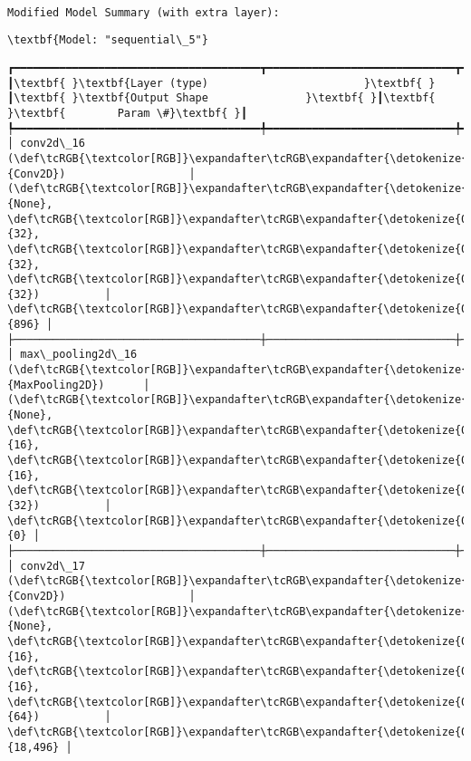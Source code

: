 \documentclass[11pt]{article}
\begin{document}
    \begin{Verbatim}[commandchars=\\\{\}]

Modified Model Summary (with extra layer):
    \end{Verbatim}

    
    \begin{Verbatim}[commandchars=\\\{\}]
\textbf{Model: "sequential\_5"}

    \end{Verbatim}

    
    
    \begin{Verbatim}[commandchars=\\\{\}]
┏━━━━━━━━━━━━━━━━━━━━━━━━━━━━━━━━━━━━━━┳━━━━━━━━━━━━━━━━━━━━━━━━━━━━━┳━━━━━━━━━━━━━━━━━┓
┃\textbf{ }\textbf{Layer (type)                        }\textbf{ }┃\textbf{ }\textbf{Output Shape               }\textbf{ }┃\textbf{ }\textbf{        Param \#}\textbf{ }┃
┡━━━━━━━━━━━━━━━━━━━━━━━━━━━━━━━━━━━━━━╇━━━━━━━━━━━━━━━━━━━━━━━━━━━━━╇━━━━━━━━━━━━━━━━━┩
│ conv2d\_16 (\def\tcRGB{\textcolor[RGB]}\expandafter\tcRGB\expandafter{\detokenize{0,135,255}}{Conv2D})                   │ (\def\tcRGB{\textcolor[RGB]}\expandafter\tcRGB\expandafter{\detokenize{0,215,255}}{None}, \def\tcRGB{\textcolor[RGB]}\expandafter\tcRGB\expandafter{\detokenize{0,175,0}}{32}, \def\tcRGB{\textcolor[RGB]}\expandafter\tcRGB\expandafter{\detokenize{0,175,0}}{32}, \def\tcRGB{\textcolor[RGB]}\expandafter\tcRGB\expandafter{\detokenize{0,175,0}}{32})          │             \def\tcRGB{\textcolor[RGB]}\expandafter\tcRGB\expandafter{\detokenize{0,175,0}}{896} │
├──────────────────────────────────────┼─────────────────────────────┼─────────────────┤
│ max\_pooling2d\_16 (\def\tcRGB{\textcolor[RGB]}\expandafter\tcRGB\expandafter{\detokenize{0,135,255}}{MaxPooling2D})      │ (\def\tcRGB{\textcolor[RGB]}\expandafter\tcRGB\expandafter{\detokenize{0,215,255}}{None}, \def\tcRGB{\textcolor[RGB]}\expandafter\tcRGB\expandafter{\detokenize{0,175,0}}{16}, \def\tcRGB{\textcolor[RGB]}\expandafter\tcRGB\expandafter{\detokenize{0,175,0}}{16}, \def\tcRGB{\textcolor[RGB]}\expandafter\tcRGB\expandafter{\detokenize{0,175,0}}{32})          │               \def\tcRGB{\textcolor[RGB]}\expandafter\tcRGB\expandafter{\detokenize{0,175,0}}{0} │
├──────────────────────────────────────┼─────────────────────────────┼─────────────────┤
│ conv2d\_17 (\def\tcRGB{\textcolor[RGB]}\expandafter\tcRGB\expandafter{\detokenize{0,135,255}}{Conv2D})                   │ (\def\tcRGB{\textcolor[RGB]}\expandafter\tcRGB\expandafter{\detokenize{0,215,255}}{None}, \def\tcRGB{\textcolor[RGB]}\expandafter\tcRGB\expandafter{\detokenize{0,175,0}}{16}, \def\tcRGB{\textcolor[RGB]}\expandafter\tcRGB\expandafter{\detokenize{0,175,0}}{16}, \def\tcRGB{\textcolor[RGB]}\expandafter\tcRGB\expandafter{\detokenize{0,175,0}}{64})          │          \def\tcRGB{\textcolor[RGB]}\expandafter\tcRGB\expandafter{\detokenize{0,175,0}}{18,496} │

\end{Verbatim}
\end{document}
